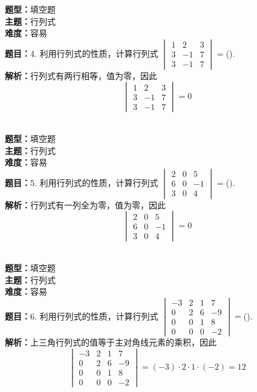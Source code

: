 \documentclass{ctexart}
\newenvironment{question}[5]{%
	\noindent\textbf{题型：}#1\\
	\textbf{主题：}#2\\
	\textbf{难度：}#3\\
	\textbf{题目：}#4\\
	\textbf{解析：}#5\\
	\vspace{1em}
}{}
\begin{document}
	\begin{question}
		{填空题}
		{行列式}
		{容易}
		{4. 利用行列式的性质，计算行列式 \(\begin{vmatrix}1 & 2 & 3 \\ 3 & -1 & 7 \\ 3 & -1 & 7\end{vmatrix}=\)(\qquad). }
		{行列式有两行相等，值为零，因此
			\[
			\begin{vmatrix}
				1 & 2 & 3 \\
				3 & -1 & 7 \\
				3 & -1 & 7
			\end{vmatrix}=0
			\]}
	\end{question}
	
	\begin{question}
		{填空题}
		{行列式}
		{容易}
		{5. 利用行列式的性质，计算行列式 \(\begin{vmatrix}2 & 0 & 5 \\ 6 & 0 & -1 \\ 3 & 0 & 4\end{vmatrix}=\)(\qquad). }
		{行列式有一列全为零，值为零，因此
			\[
			\begin{vmatrix}
				2 & 0 & 5 \\
				6 & 0 & -1 \\
				3 & 0 & 4
			\end{vmatrix}=0
			\]}
	\end{question}
	
	\begin{question}
		{填空题}
		{行列式}
		{容易}
		{6. 利用行列式的性质，计算行列式 \(\begin{vmatrix}-3 & 2 & 1 & 7 \\ 0 & 2 & 6 & -9 \\ 0 & 0 & 1 & 8 \\ 0 & 0 & 0 & -2\end{vmatrix}=\)(\qquad). }
		{上三角行列式的值等于主对角线元素的乘积，因此
			\[
			\begin{vmatrix}
				-3 & 2 & 1 & 7 \\
				0 & 2 & 6 & -9 \\
				0 & 0 & 1 & 8 \\
				0 & 0 & 0 & -2
			\end{vmatrix}=(-3)\cdot2\cdot1\cdot(-2)=12
			\]}
	\end{question}
	
\end{document}
